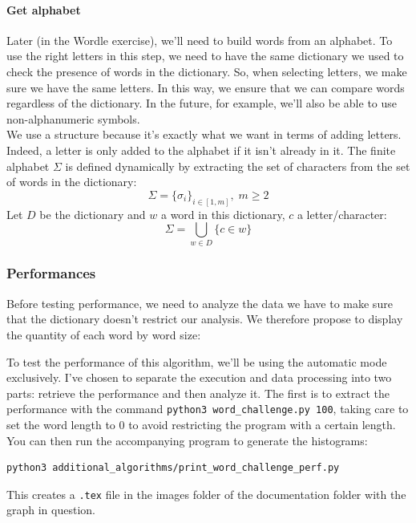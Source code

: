 \documentclass[10pt,a4paper,hidelinks]{article}
\begin{document}
\paragraph{Get alphabet}
Later (in the Wordle exercise), we'll need to build words from an alphabet. To use the right letters in this step, we need to have the same dictionary we used to check the presence of words in the dictionary. So, when selecting letters, we make sure we have the same letters. In this way, we ensure that we can compare words regardless of the dictionary. In the future, for example, we'll also be able to use non-alphanumeric symbols.\\

We use a  structure because it's exactly what we want in terms of adding letters. Indeed, a letter is only added to the alphabet if it isn't already in it.\label{set}
The finite alphabet $\Sigma$ is defined dynamically by extracting the set of characters from the set of words in the dictionary:
$$\Sigma = \{\sigma_i\}_{i\in[1, m]},\; m\geqslant 2$$
Let $D$ be the dictionary and $w$ a word in this dictionary, $c$ a letter/character:
$$\Sigma = \bigcup_{w\in D}\{c\in w\}$$

\subsubsection{Performances}
Before testing performance, we need to analyze the data we have to make sure that the dictionary doesn't restrict our analysis. We therefore propose to display the quantity of each word by word size:


To test the performance of this algorithm, we'll be using the automatic mode exclusively. I've chosen to separate the execution and data processing into two parts: retrieve the performance and then analyze it. The first is to extract the performance with the command \verb|python3 word_challenge.py 100|, taking care to set the word length to $0$ to avoid restricting the program with a certain length.\\

You can then run the accompanying program to generate the histograms:
\begin{lstlisting}
python3 additional_algorithms/print_word_challenge_perf.py
\end{lstlisting}
This creates a \verb|.tex| file in the images folder of the documentation folder with the graph in question.\\
\end{document}
